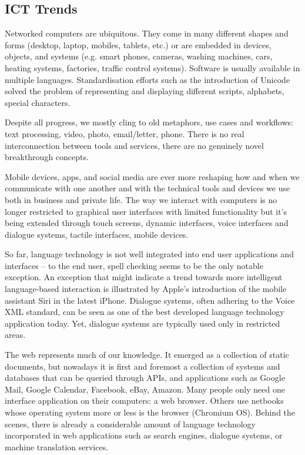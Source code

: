 \documentclass[10pt, plain]{../../metanetpaper}
\begin{document}
\begin{multicols}{2}

\subsection{ICT Trends}
\label{sec:ict-trends}

Networked computers are ubiquitous. They come in many different shapes and forms (desktop, laptop, mobiles, tablets, etc.) or are embedded in devices, objects, and systems (e.g. smart phones, cameras, washing machines, cars, heating systems, factories, traffic control systems). Software is usually available in multiple languages. Standardisation efforts such as the introduction of Unicode solved the problem of representing and displaying different scripts, alphabets, special characters. 

Despite all progress, we mostly cling to old metaphors, use cases and workflows: text processing, video, photo, email/letter, phone. There is no real interconnection between tools and services, there are no genuinely novel breakthrough concepts.

Mobile devices, apps, and social media are ever more reshaping how and when we communicate with one another and with the technical tools and devices we use both in business and private life. The way we interact with computers is no longer restricted to graphical user interfaces with limited functionality but it’s being extended through touch screens, dynamic interfaces, voice interfaces and dialogue systems, tactile interfaces, mobile devices. 

So far, language technology is not well integrated into end user applications and interfaces -- to the end user, spell checking seems to be the only notable exception. An exception that might indicate a trend towards more intelligent language-based interaction is illustrated by Apple’s introduction of the mobile assistant Siri in the latest iPhone. Dialogue systems, often adhering to the Voice XML standard, can be seen as one of the best developed language technology application today. Yet, dialogue systems are typically used only in restricted areas.

The web represents much of our knowledge. It emerged as a collection of static documents, but nowadays it is first and foremost a collection of systems and databases that can be queried through APIs, and applications such as Google Mail, Google Calendar, Facebook, eBay, Amazon. Many people only need one interface application on their computers: a web browser. Others use netbooks whose operating system more or less is the browser (Chromium OS). Behind the scenes, there is already a considerable amount of language technology incorporated in web applications such as search engines, dialogue systems, or machine translation services.


\end{multicols}
\end{document}

